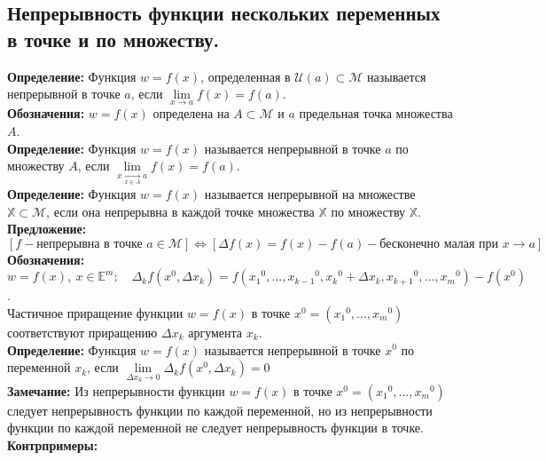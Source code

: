 \documentclass[a4paper,14pt]{extreport}
\begin{document}
\subsection*{Непрерывность функции нескольких переменных в точке и по множеству.}
\textbf{Определение:} Функция $w = f(x)$, определенная в $\mathscr{U}(a) \subset \mathscr{M}$ называется непрерывной в точке $a$, если $\lim\limits_{x \to a}f(x) = f(a)$.
\\[2mm]\textbf{Обозначения:} $ w = f(x)$ определена на $A \subset \mathscr{M}$ и $a$ предельная точка множества $A$.
\\[2mm]\textbf{Определение:} Функция $w = f(x)$ называется непрерывной в точке $a$ по
множеству $A$, если $\lim\limits_{x \xrightarrow[x \in A]{} a}f(x) = f(a)$.
\\[2mm]\textbf{Определение:} Функция $w = f(x)$ называется непрерывной на множестве 
$\mathbb{X} \subset \mathscr{M}$, если она непрерывна в каждой точке множества 
$\mathbb{X}$ по множеству $\mathbb{X}$.
\\[2mm]\textbf{Предложение:} $[f - \text{непрерывна в точке }a \in \mathscr{M}] \Leftrightarrow [\Delta f(x) = f(x) - f(a) - \text{бесконечно малая при } x \to a]$
\\[2mm]\textbf{Обозначения:} $w = f(x), ~ x \in \mathbb{E}^m; \quad \Delta_kf(x^0, \Delta x_k) = f({x_1}^0, ..., {x_{k-1}}^0, {x_{k}}^0 + \Delta x_k, {x_{k+1}}^0, ..., {x_{m}}^0) - f(x^0)$.
\\[2mm]
Частичное приращение функции $w = f(x)$ в точке $x^0 = ({x_1}^0, ..., {x_m}^0)$ соответствуют приращению $\Delta x_k$ аргумента $x_k$.
\\[2mm]\textbf{Определение:} Функция $w = f(x)$ называется непрерывной в точке $x^0$ по переменной $x_k$, если $\lim\limits_{\Delta x_k \to 0}\Delta_k f(x^0, \Delta x_k) = 0$
\\[2mm]\textbf{Замечание:} Из непрерывности функции $w = f(x)$ в точке $x^0 = ({x_1}^0, ..., {x_m}^0)$ следует непрерывность функции по каждой переменной, но из непрерывности функции по каждой переменной не следует непрерывность функции в точке.
\\[5mm]\textbf{Контрпримеры:}
\end{document}
